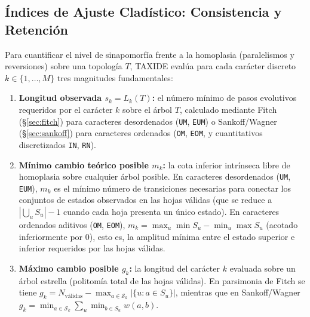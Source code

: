 \documentclass[11pt,a4paper]{article}
\theoremstyle{definition}
\theoremstyle{remark}
\begin{document}
\subsection{Índices de Ajuste Cladístico: Consistencia y Retención}
\label{sec:indices}
Para cuantificar el nivel de sinapomorfía frente a la homoplasia (paralelismos y reversiones) sobre una topología $T$, TAXIDE evalúa para cada carácter discreto $k \in \{1, \dots, M\}$ tres magnitudes fundamentales:
\begin{enumerate}
    \item \textbf{Longitud observada $s_k = L_k(T)$:} el número mínimo de pasos evolutivos requeridos por el carácter $k$ sobre el árbol $T$, calculado mediante Fitch (\S\ref{sec:fitch}) para caracteres desordenados (\texttt{UM}, \texttt{EUM}) o Sankoff/Wagner (\S\ref{sec:sankoff}) para caracteres ordenados (\texttt{OM}, \texttt{EOM}, y cuantitativos discretizados \texttt{IN}, \texttt{RN}).
    \item \textbf{Mínimo cambio teórico posible $m_k$:} la cota inferior intrínseca libre de homoplasia sobre cualquier árbol posible. En caracteres desordenados (\texttt{UM}, \texttt{EUM}), $m_k$ es el mínimo número de transiciones necesarias para conectar los conjuntos de estados observados en las hojas válidas (que se reduce a $|\bigcup_{u} S_u| - 1$ cuando cada hoja presenta un único estado). En caracteres ordenados aditivos (\texttt{OM}, \texttt{EOM}), $m_k = \max_{u} \min S_u - \min_{u} \max S_u$ (acotado inferiormente por $0$), esto es, la amplitud mínima entre el estado superior e inferior requeridos por las hojas válidas.
    \item \textbf{Máximo cambio posible $g_k$:} la longitud del carácter $k$ evaluada sobre un árbol estrella (politomía total de las hojas válidas). En parsimonia de Fitch se tiene $g_k = N_{\text{válidas}} - \max_{a \in \mathcal{S}_k} |\{u : a \in S_u\}|$, mientras que en Sankoff/Wagner $g_k = \min_{a \in \mathcal{S}_k} \sum_{u} \min_{b \in S_u} w(a, b)$.
\end{enumerate}
\end{document}
